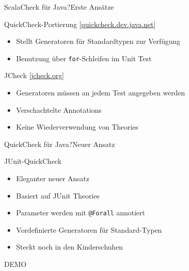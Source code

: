 
\begin{frame}{ScalaCheck für Java?}{Erste Ansätze}
	\begin{block}{QuickCheck-Portierung [\href{https://quickcheck.dev.java.net/}{quickcheck.dev.java.net}]}
	\begin{itemize}
		\item Stellt Generatoren für Standardtypen zur Verfügung
		\item Benutzung über \texttt{for}-Schleifen im Unit Test
	\end{itemize}
	\end{block}
	\pause
	\begin{block}{JCheck [\href{http://www.jcheck.org/}{jcheck.org}]}
	\begin{itemize}
		\item Generatoren müssen an jedem Test angegeben werden
		\item Verschachtelte Annotations
		\item Keine Wiederverwendung von Theories
	\end{itemize}
	\end{block}
\end{frame}
\begin{frame}{QuickCheck für Java?}{Neuer Ansatz}
	\begin{block}{JUnit-QuickCheck}
	\begin{itemize}
		\item Eleganter neuer Ansatz
		\item Basiert auf JUnit Theories
		\item Parameter werden mit \texttt{@Forall} annotiert
		\item Vordefinierte Generatoren für Standard-Typen
		\item Steckt noch in den Kinderschuhen
	\end{itemize}
	\end{block}
\end{frame}

\begin{frame}{}
\begin{center}
DEMO
\end{center}
\end{frame}


